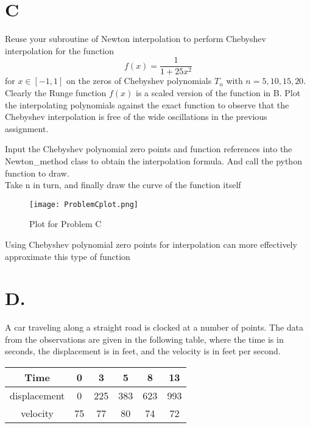 \documentclass[a4paper]{article}
\begin{document}
    
    \section*{C}
    Reuse your subroutine of Newton interpolation to perform Chebyshev interpolation for the function
    \[
    f(x) = \frac{1}{1 + 25x^2}
    \]
    for $x \in [-1, 1]$ on the zeros of Chebyshev polynomials $T_n$ with $n = 5, 10, 15, 20$. Clearly the Runge function $f(x)$ is a scaled version of the function in B. Plot the interpolating polynomials against the exact function to observe that the Chebyshev interpolation is free of the wide oscillations in the previous assignment.
    
    Input the Chebyshev polynomial zero points and function references into the Newton\_method class to obtain the interpolation formula.
    And call the python function to draw. \\
    Take n in turn, and finally draw the curve of the function itself \\
    \begin{figure}[H]
        \centering 
        \texttt{[image: ProblemCplot.png]} 
        \caption{Plot for Problem C} 
        \label{fig:example} 
    \end{figure}
    Using Chebyshev polynomial zero points for interpolation can more effectively approximate this type of function\\
    
    
    \section*{D.}
    A car traveling along a straight road is clocked at a number of points. The data from the observations are given in the following table, where the time is in seconds, the displacement is in feet, and the velocity is in feet per second.
    
    \begin{table}[H]
        \centering
        \begin{tabular}{@{}cccccc@{}}
            \toprule
            Time & 0 & 3 & 5 & 8 & 13 \\ \midrule
            displacement & 0 & 225 & 383 & 623 & 993 \\
            velocity & 75 & 77 & 80 & 74 & 72 \\ \bottomrule
        \end{tabular}
    \end{table}
    
\end{document}
